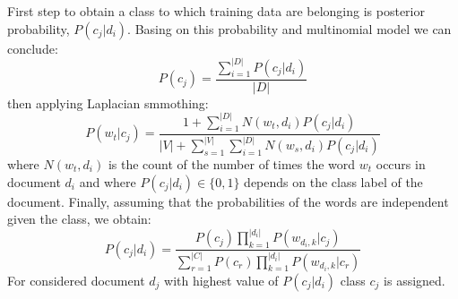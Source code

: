 First step to obtain a class to which training data are belonging is posterior probability, $P(c_j |d_i )$. Basing on this probability and multinomial model \cite{5}we can conclude:
\begin{equation}
P(c_j) = \frac{\sum_{i=1}^{|D|}P(c_j |d_i )}{|D|}
\end{equation}
\newline then applying Laplacian smmothing:
\begin{equation}
P(w_t|c_j)=\frac{1+\sum_{i=1}^{|D|}N(w_t,d_i)P(c_j|d_i)}{|V|+\sum_{s=1}^{|V|} \sum_{i=1}^{|D|}N(w_s,d_i)P(c_j|d_i)}
\end{equation}
\newline 
where $N(w_t,d_i)$ is the count of the number of times the word $w_t$ occurs in document
$d_i$ and where $P(c_j|d_i) \in \{0,1\} $ depends on the class label of the document.
Finally, assuming that the probabilities of the words are independent given the
class, we obtain:
\begin{equation}
P(c_j|d_i)=\frac{P(c_j)\prod_{k=1}^{|d_i|}P(w_{d_i,k}| c_j)}{\sum_{r=1}^{|C|}P(c_r)\prod_{k=1}^{|d_i|}P(w_{d_i,k}|c_r)}
\end{equation}
\newline For considered document $d_j$ with highest value of $P(c_j|d_i)$ class $c_j$ is assigned.

